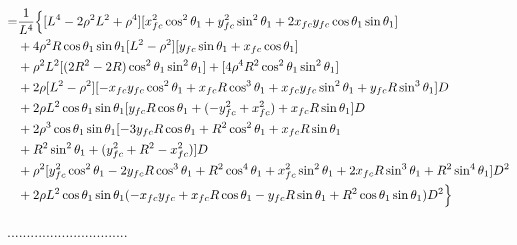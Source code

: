 \documentclass[12pt]{article}
\begin{document}
\begin{align}
    =& \frac{1}{L^4} \Bigl\{ [ L^4 -2\rho^2L^2 + \rho^4 ][x_{fc}^2\cos^2\theta_1  + y_{fc}^2\sin^2\theta_1 + 2x_{fc}y_{fc}\cos\theta_1\sin\theta_1] \nonumber\\
    &+  4\rho^2R\cos\theta_1\sin\theta_1[ L^2 - \rho^2 ][ y_{fc}\sin\theta_1 + x_{fc}\cos\theta_1 ] \nonumber\\
    &+ \rho^2L^2[(2R^2-2R)\cos^2\theta_1\sin^2\theta_1] + [ 4\rho^4R^2\cos^2\theta_1\sin^2\theta_1  ] \nonumber\\
    &+ 2\rho[  L^2 - \rho^2  ][ -x_{fc}y_{fc}\cos^2\theta_1 +x_{fc}R\cos^3\theta_1 + x_{fc}y_{fc}\sin^2\theta_1 + y_{fc}R\sin^3\theta_1 ]D \nonumber\\
    &+ 2\rho L^2\cos\theta_1\sin\theta_1[y_{fc}R\cos\theta_1 + (-y_{fc}^2 + x_{fc}^2) + x_{fc}R\sin\theta_1 ]D \nonumber\\
    &+ 2\rho^3\cos\theta_1\sin\theta_1[ -3y_{fc}R\cos\theta_1 +R^2\cos^2\theta_1 + x_{fc}R\sin\theta_1 \nonumber\\
    &+ R^2\sin^2\theta_1 +  (y_{fc}^2 +R^2 -x_{fc}^2)  ]D \nonumber\\
    &+ \rho^2[y_{fc}^2\cos^2\theta_1 -2y_{fc}R\cos^3\theta_1 +R^2\cos^4\theta_1 + x_{fc}^2\sin^2\theta_1 + 2x_{fc}R\sin^3\theta_1 + R^2\sin^4\theta_1]D^2 \nonumber\\
    &+ 2\rho L^2\cos\theta_1\sin\theta_1(-x_{fc}y_{fc} + x_{fc}R\cos\theta_1 -y_{fc}R\sin\theta_1 +  R^2\cos\theta_1\sin\theta_1 )D^2 \Bigr\}
\end{align}

...............................
\end{document}
